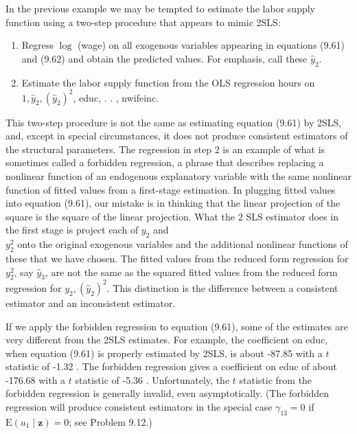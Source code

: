 \documentclass[10pt]{article}
\begin{document}
In the previous example we may be tempted to estimate the labor supply function using a two-step procedure that appears to mimic 2SLS:

\begin{enumerate}
  \item Regress $\log$ (wage) on all exogenous variables appearing in equations (9.61) and (9.62) and obtain the predicted values. For emphasis, call these $\hat{y}_{2}$.
  \item Estimate the labor supply function from the OLS regression hours on $1, \hat{y}_{2},\left(\hat{y}_{2}\right)^{2}$, educ, . . , nwifeinc.
\end{enumerate}

This two-step procedure is not the same as estimating equation (9.61) by 2SLS, and, except in special circumstances, it does not produce consistent estimators of the structural parameters. The regression in step 2 is an example of what is sometimes called a forbidden regression, a phrase that describes replacing a nonlinear function of an endogenous explanatory variable with the same nonlinear function of fitted values from a first-stage estimation. In plugging fitted values into equation (9.61), our mistake is in thinking that the linear projection of the square is the square of the linear projection. What the 2 SLS estimator does in the first stage is project each of $y_{2}$ and\\
$y_{2}^{2}$ onto the original exogenous variables and the additional nonlinear functions of these that we have chosen. The fitted values from the reduced form regression for $y_{2}^{2}$, say $\hat{y}_{3}$, are not the same as the squared fitted values from the reduced form regression for $y_{2},\left(\hat{y}_{2}\right)^{2}$. This distinction is the difference between a consistent estimator and an inconsistent estimator.

If we apply the forbidden regression to equation (9.61), some of the estimates are very different from the 2SLS estimates. For example, the coefficient on educ, when equation (9.61) is properly estimated by 2SLS, is about -87.85 with a $t$ statistic of -1.32 . The forbidden regression gives a coefficient on educ of about -176.68 with a $t$ statistic of -5.36 . Unfortunately, the $t$ statistic from the forbidden regression is generally invalid, even asymptotically. (The forbidden regression will produce consistent estimators in the special case $\gamma_{13}=0$ if $\mathrm{E}\left(u_{1} \mid \mathbf{z}\right)=0$; see Problem 9.12.)
\end{document}
